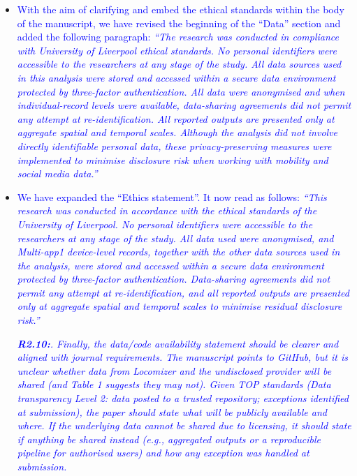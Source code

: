 \documentclass[
  letterpaper,
  DIV=11,
  numbers=noendperiod]{scrartcl}
\begin{document}
\begin{itemize}[noitemsep, topsep=0pt]
\item \textcolor{blue}{With the aim of clarifying and embed the ethical standards within the body of the manuscript, we have revised the beginning of the ``Data'' section and added the following paragraph: \textit{``The research was conducted in compliance with University of Liverpool ethical standards. No personal identifiers were accessible to the researchers at any stage of the study. All data sources used in this analysis were stored and accessed within a secure data environment protected by three-factor authentication. All data were anonymised and when individual-record levels were available, data-sharing agreements did not permit any attempt at re-identification. All reported outputs are presented only at aggregate spatial and temporal scales. Although the analysis did not involve directly identifiable personal data, these privacy-preserving measures were implemented to minimise disclosure risk when working with mobility and social media data.''}}
\item \textcolor{blue}{We have expanded the ``Ethics statement''. It now read as follows: \textit{``This research was conducted in accordance with the ethical standards of the University of Liverpool. No personal identifiers were accessible to the researchers at any stage of the study. All data used were anonymised, and Multi-app1 device-level records, together with the other data sources used in the analysis, were stored and accessed within a secure data environment protected by three-factor authentication. Data-sharing agreements did not permit any attempt at re-identification, and all reported outputs are presented only at aggregate spatial and temporal scales to minimise residual disclosure risk.''}

\setlength{\leftskip}{0cm}\textit{\textbf{R2.10:}. Finally, the data/code availability statement should be clearer and aligned with journal requirements. The manuscript points to GitHub, but it is unclear whether data from Locomizer and the undisclosed provider will be shared (and Table 1 suggests they may not). Given TOP standards (Data transparency Level 2: data posted to a trusted repository; exceptions identified at submission), the paper should state what will be publicly available and where. If the underlying data cannot be shared due to licensing, it should state if anything be shared instead (e.g., aggregated outputs or a reproducible pipeline for authorised users) and how any exception was handled at submission.}

}
\end{itemize}
\end{document}
